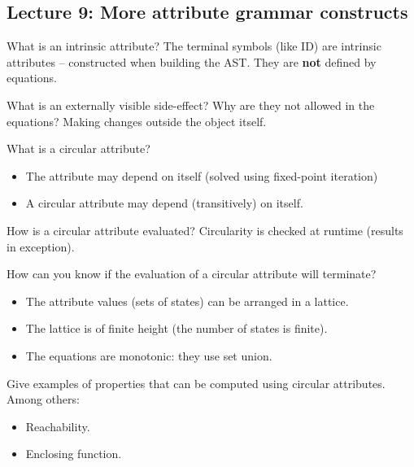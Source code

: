\documentclass[11pt]{beamer}
\begin{document}
\subsection{Lecture 9: More attribute grammar constructs}
\begin{frame}
\begin{block}{What is an intrinsic attribute? }
The terminal symbols (like ID) are intrinsic attributes – constructed when building the AST. They are \textbf{not} defined by equations.
\end{block}

\begin{block}{What is an externally visible side-effect? Why are they not allowed in the equations? }
Making changes outside the object itself.
\end{block}

\begin{block}{What is a circular attribute?}
\begin{itemize}
\item The attribute may depend on itself (solved using fixed-point iteration)
\item A circular attribute may depend (transitively) on itself.
\end{itemize}
\end{block}

\end{frame}

\begin{frame}
\begin{block}{How is a circular attribute evaluated? }
Circularity is checked at runtime (results in exception).
\end{block}

\begin{block}{How can you know if the evaluation of a circular attribute will terminate? }
\begin{itemize}
\item The attribute values (sets of states) can be arranged in a lattice.
\item The lattice is of finite height (the number of states is finite).
\item The equations are monotonic: they use set union.
\end{itemize}
\end{block}

\begin{block}{Give examples of properties that can be computed using circular attributes. }
Among others:
\begin{itemize}
\item Reachability.
\item Enclosing function.
\end{itemize}
\end{block}


\end{frame}
\end{document}
